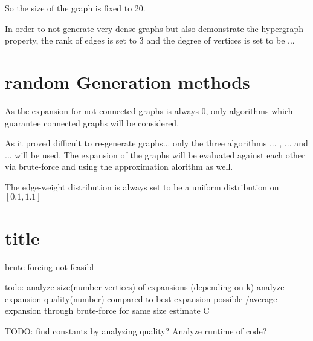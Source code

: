 So the size of the graph is fixed to 20.




In order to not generate very dense graphs but also demonstrate the hypergraph property, the rank of edges is set to 3 and the degree of vertices is set to be ... 




\section{random Generation methods}

As the expansion for not connected graphs is always 0, only algorithms which guarantee connected graphs will be considered.

As it proved difficult to re-generate graphs... only the three algorithms ... , ... and ... will be used. The expansion of the graphs will be evaluated against each other via brute-force and using the approximation alorithm as well.


The edge-weight distribution is always set to be a uniform distribution on $[0.1, 1.1]$
\section{title}

brute forcing not feasibl

todo: analyze size(number vertices) of expansions (depending on k)
analyze expansion quality(number) compared to best expansion possible /average expansion through brute-force for same size
estimate C



TODO: find constants by analyzing quality?
Analyze runtime of code? 
